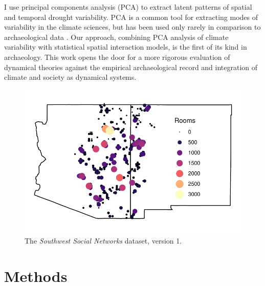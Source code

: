 \documentclass[10pt]{iopart}
\begin{document}
I use principal components analysis (PCA) to extract latent patterns of spatial and temporal drought variability. PCA is a common tool for extracting modes of variability in the climate sciences, but has been used only rarely in comparison to archaeological data \parencite{Weiss1982,vanwest}. Our approach, combining PCA analysis of climate variability with statistical spatial interaction models, is the first of its kind in archaeology. This work opens the door for a more rigorous evaluation of dynamical theories against the empirical archaeological record and integration of climate and society as dynamical systems.


\begin{figure}[!ht]
\centering
\includegraphics[width=.9\linewidth]{figures/site_distribution.pdf}
\caption{The \emph{Southwest Social Networks} dataset, version 1.} 
\label{fig:network-plot}
\end{figure}

\section*{Methods}
\end{document}
